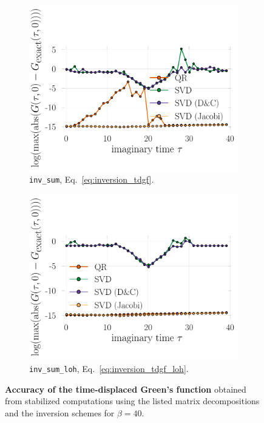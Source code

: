 \documentclass[submission, Phys]{SciPost}
\begin{document}
\begin{figure}
	\centering
	\begin{subfigure}{0.48\textwidth}
		\includegraphics[width=\textwidth]{figures/accuracy_tdgf_U0.pdf}
		\caption{\texttt{inv\_sum}, Eq.~\eqref{eq:inversion_tdgf}. \label{fig:tdgf_accuracy_regularinv}}
	\end{subfigure}%
	\hspace{10pt}
	\begin{subfigure}{0.48\textwidth}
		\includegraphics[width=\textwidth]{figures/accuracy_tdgf_loh_U0.pdf}
		\caption{\texttt{inv\_sum\_loh}, Eq.~\eqref{eq:inversion_tdgf_loh}. \label{fig:tdgf_accuracy_loh}}
	\end{subfigure}
	\vspace{5pt}
	\caption{\textbf{Accuracy of the time-displaced Green's function} obtained from stabilized computations using the listed matrix decompositions and the inversion schemes for $\beta = 40$.}
\end{figure}
\end{document}
